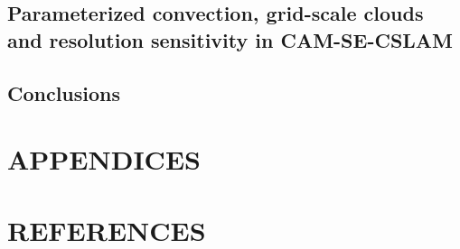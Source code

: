 \documentclass[12pt]{article}
\begin{document}
\newpage
\begin{center}
\section{Parameterized convection, grid-scale clouds and resolution sensitivity in CAM-SE-CSLAM} \label{sec:chapter6}
\end{center}


\newpage
\begin{center}
\section{Conclusions}\label{sec:chapter7}
\end{center}


\newpage
\section{APPENDICES}


\newpage
\section*{REFERENCES}
\singlespace
{\normalsize
}
\end{document}
